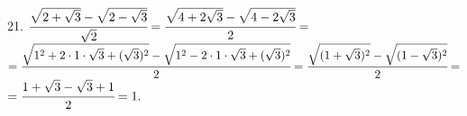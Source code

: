 21. $\cfrac{\sqrt{2+\sqrt{3}}-\sqrt{2-\sqrt{3}}}{\sqrt{2}}=\cfrac{\sqrt{4+2\sqrt{3}}-\sqrt{4-2\sqrt{3}}}{2}=$\\$=
\cfrac{\sqrt{1^2+2\cdot1\cdot\sqrt{3}+(\sqrt{3})^2}-\sqrt{1^2-2\cdot1\cdot\sqrt{3}+(\sqrt{3})^2}}{2}=
\cfrac{\sqrt{(1+\sqrt{3})^2}-\sqrt{(1-\sqrt{3})^2}}{2}=$\\$=\cfrac{1+\sqrt{3}-\sqrt{3}+1}{2}=1.$\\
